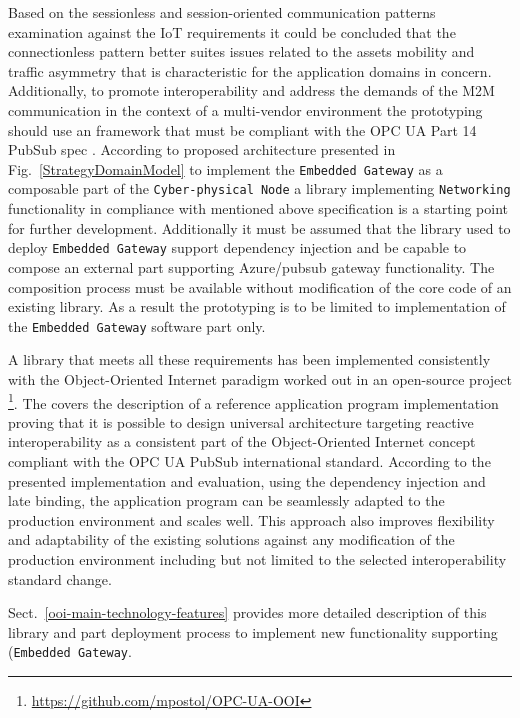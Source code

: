 \documentclass{jacsart}
\begin{document}
Based on the sessionless and session-oriented communication patterns examination against the IoT requirements \cite{mpostol2020} it could be concluded that the connectionless pattern better suites issues related to the assets mobility and traffic asymmetry that is characteristic for the application domains in concern. Additionally, to promote
interoperability and address the demands of the M2M communication in the context of a multi-vendor environment the prototyping should use an
framework that must be compliant with the OPC UA Part 14 PubSub spec \cite{RefWorks:doc:5d98837de4b055984c0eecf0}. According to proposed architecture presented in Fig.~\ref*{StrategyDomainModel} to implement the \texttt{Embedded\ Gateway} as a composable part of the \texttt{Cyber-physical\ Node} a library implementing \texttt{Networking} functionality in compliance with mentioned above specification is a starting point for further development. Additionally it must be assumed that the library used to deploy \texttt{Embedded\ Gateway} support dependency injection and be capable to compose an external part supporting Azure/pubsub gateway functionality. The composition process must be available without modification of the core code of an existing library. As a result the prototyping is to be limited to implementation of the \texttt{Embedded\ Gateway} software part only.

A library that meets all these requirements has been implemented consistently with the Object-Oriented Internet paradigm \cite{RefWorks:doc:5c66740ae4b081adf5804596}
worked out in an open-source project \footnote{ \url{https://github.com/mpostol/OPC-UA-OOI} }. The \cite{mpostol2020}
covers the description of a reference application program implementation proving that it is possible to design
universal architecture targeting reactive interoperability as a
consistent part of the Object-Oriented Internet concept compliant with
the OPC UA PubSub \cite{RefWorks:doc:5d98837de4b055984c0eecf0} international standard. According to the presented implementation and
evaluation, using the dependency injection and late binding, the
application program can be seamlessly adapted to the production
environment and scales well. This approach also improves flexibility and
adaptability of the existing solutions against any modification of the
production environment including but not limited to the selected
interoperability standard change.

Sect.~\ref*{ooi-main-technology-features} provides more detailed description of this library and part deployment process to implement new functionality supporting (\texttt{Embedded\ Gateway}.
\end{document}

